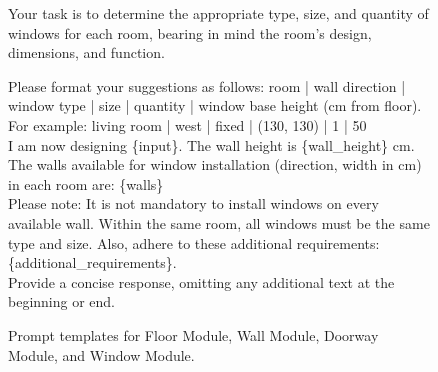\begin{figure}[!b]
\begin{center}
\begin{tcolorbox} [top=2pt,bottom=2pt, width=\linewidth, boxrule=1pt]
{{    Your task is to determine the appropriate type, size, and quantity of windows for each room, bearing in mind the room's design, dimensions, and function.
    
    Please format your suggestions as follows: room | wall direction | window type | size | quantity | window base height (cm from floor). For example:
    living room | west | fixed | (130, 130) | 1 | 50 \\
    
    I am now designing \{input\}. The wall height is \{wall\_height\} cm. \\
    The walls available for window installation (direction, width in cm) in each room are:
    \{walls\} \\
    Please note: It is not mandatory to install windows on every available wall. Within the same room, all windows must be the same type and size.
    Also, adhere to these additional requirements: \{additional\_requirements\}. \\
    
    Provide a concise response, omitting any additional text at the beginning or end. 
    }
    \par}
    \end{tcolorbox}
    
    \end{center}
    \caption{Prompt templates for Floor Module, Wall Module, Doorway Module, and Window Module.}
    \label{fig:prompt-1}
    \vspace{-.3cm}
\end{figure}